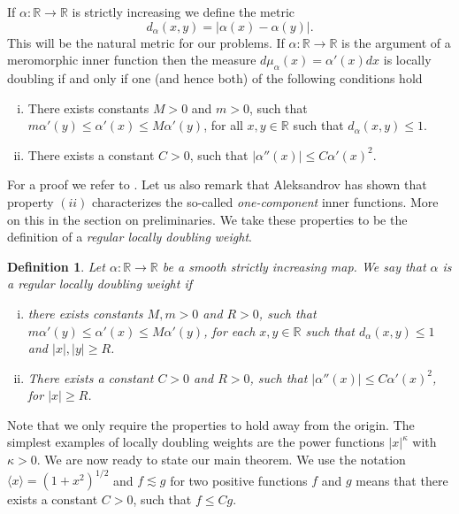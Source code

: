 \documentclass{article}[12pt]
\newtheorem{definition}{Definition}
\theoremstyle{remark}
\begin{document}
If $\alpha : \mathbb{R} \to \mathbb{R}$ is strictly increasing we define the metric
\begin{equation*}
    d_{\alpha}(x,y) = \lvert \alpha(x)-\alpha(y) \rvert.
\end{equation*}
This will be the natural metric for our problems. If $\alpha : \mathbb{R} \to \mathbb{R}$ is the argument of a meromorphic inner function then the measure $d\mu_{\alpha}(x) = \alpha'(x)dx$ is locally doubling if and only if one (and hence both) of the following conditions hold
\begin{enumerate}[(i)]
    \item There exists constants $M>0$ and $m > 0$, such that $m\alpha'(y) \leq \alpha'(x) \leq M \alpha'(y)$, for all $x, y \in \mathbb{R}$ such that $d_{\alpha}(x,y) \leq 1$.
    \item There exists a constant $C > 0$, such that $\lvert \alpha''(x) \rvert \leq C\alpha'(x)^{2}$.
\end{enumerate}
For a proof we refer to \cite{MR2944102}. Let us also remark that Aleksandrov has shown that property $(ii)$ characterizes the so-called \textit{one-component} inner functions. More on this in the section on preliminaries. We take these properties to be the definition of a \textit{regular locally doubling weight}.

\begin{definition}
    Let $\alpha : \mathbb{R} \to \mathbb{R}$ be a smooth strictly increasing map. We say that $\alpha$ is a \textit{regular locally doubling weight} if
    \begin{enumerate}[(i)]
    \item there exists constants $M,m > 0$ and $R > 0$, such that $m\alpha'(y) \leq \alpha'(x) \leq M \alpha'(y)$, for each $x, y \in \mathbb{R}$ such that $d_{\alpha}(x,y) \leq 1$ and $\lvert x \rvert, \lvert y \rvert \geq R$.
    \item There exists a constant $C > 0$ and $R > 0$, such that $\lvert \alpha''(x) \rvert \leq C\alpha'(x)^{2}$, for $\lvert x \rvert \geq R$.
\end{enumerate}
\end{definition}

Note that we only require the properties to hold away from the origin. The simplest examples of locally doubling weights are the power functions $\lvert x \rvert^{\kappa}$ with $\kappa > 0$. We are now ready to state our main theorem. We use the notation $\langle x \rangle = (1+x^{2})^{1/2}$ and $f \lesssim g$ for two positive functions $f$ and $g$ means that there exists a constant $C > 0$, such that $f \leq Cg$.
\end{document}

